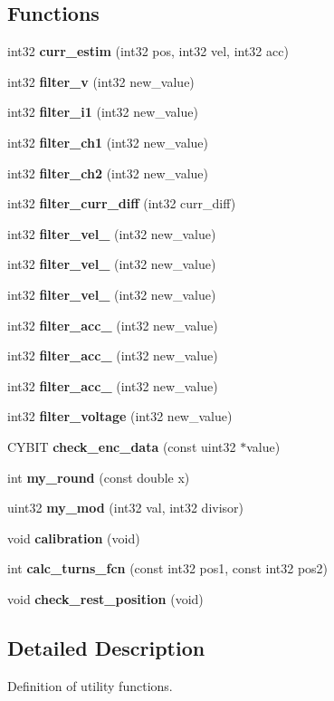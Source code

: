 \subsection*{Functions}
\begin{DoxyCompactItemize}
\item 
int32 \textbf{ curr\+\_\+estim} (int32 pos, int32 vel, int32 acc)
\item 
int32 \textbf{ filter\+\_\+v} (int32 new\+\_\+value)
\item 
int32 \textbf{ filter\+\_\+i1} (int32 new\+\_\+value)
\item 
int32 \textbf{ filter\+\_\+ch1} (int32 new\+\_\+value)
\item 
int32 \textbf{ filter\+\_\+ch2} (int32 new\+\_\+value)
\item 
int32 \textbf{ filter\+\_\+curr\+\_\+diff} (int32 curr\+\_\+diff)
\item 
int32 \textbf{ filter\+\_\+vel\+\_} (int32 new\+\_\+value)
\item 
int32 \textbf{ filter\+\_\+vel\+\_} (int32 new\+\_\+value)
\item 
int32 \textbf{ filter\+\_\+vel\+\_} (int32 new\+\_\+value)
\item 
int32 \textbf{ filter\+\_\+acc\+\_} (int32 new\+\_\+value)
\item 
int32 \textbf{ filter\+\_\+acc\+\_} (int32 new\+\_\+value)
\item 
int32 \textbf{ filter\+\_\+acc\+\_} (int32 new\+\_\+value)
\item 
int32 \textbf{ filter\+\_\+voltage} (int32 new\+\_\+value)
\item 
C\+Y\+B\+IT \textbf{ check\+\_\+enc\+\_\+data} (const uint32 $\ast$value)
\item 
int \textbf{ my\+\_\+round} (const double x)
\item 
uint32 \textbf{ my\+\_\+mod} (int32 val, int32 divisor)
\item 
void \textbf{ calibration} (void)
\item 
int \textbf{ calc\+\_\+turns\+\_\+fcn} (const int32 pos1, const int32 pos2)
\item 
void \textbf{ check\+\_\+rest\+\_\+position} (void)
\end{DoxyCompactItemize}


\subsection{Detailed Description}
Definition of utility functions. 

